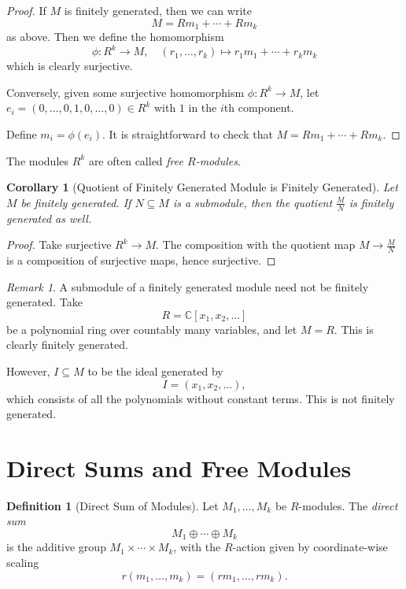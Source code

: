 \documentclass{article}
\newtheorem{corollary}[theorem]{Corollary}
\theoremstyle{definition}
\newtheorem{definition}[theorem]{Definition}
\theoremstyle{remark}
\newtheorem{remark}[theorem]{Remark}
\newcommand{\pqty}[1]{\left(#1\right)}
\newcommand{\bqty}[1]{\left[#1\right]}
\newcommand{\flatfrac}[2]{\frac{#1}{#2}}
\newcommand{\functiondomain}[3]{#1:#2\to #3}
\newcommand{\function}[5]{#1:#2\to #3,\quad #4\mapsto #5}
\newcommand{\submodule}{\subseteq}
\newcommand{\CC}{\mathbb{C}}
\begin{document}
\begin{proof}
    If \(M\) is finitely generated, then we can write
    \[
        M = R m_1 + \cdots + R m_k
    \]
    as above. Then we define the homomorphism
    \[
        \function{\phi}{R^k}{M}{\pqty{r_1, \ldots, r_k}}{r_1 m_1 + \cdots + r_k m_k}
    \]
    which is clearly surjective.

    Conversely, given some surjective homomorphism \(\functiondomain{\phi}{R^k}{M}\), let \(e_i = \pqty{0, \ldots, 0, 1, 0, \ldots, 0} \in R^k\) with \(1\) in the \(i\)th component.

    Define \(m_i = \phi\pqty{e_i}\). It is straightforward to check that \(M = R m_1 + \cdots + R m_k\).
\end{proof}

The modules \(R^k\) are often called \emph{free \(R\)-modules}.

\begin{corollary}[Quotient of Finitely Generated Module is Finitely Generated]
    \label{cor:quotient-finitely-generated}%
    Let \(M\) be finitely generated. If \(N \submodule M\) is a submodule, then the quotient \(\flatfrac{M}{N}\) is finitely generated as well.
\end{corollary}

\begin{proof}
    Take surjective \(R^k \to M\). The composition with the quotient map \(M \to \flatfrac{M}{N}\) is a composition of surjective maps, hence surjective.
\end{proof}

\begin{remark}
    A submodule of a finitely generated module need not be finitely generated. Take
    \[
        R = \CC\bqty{x_1, x_2, \ldots}
    \]
    be a polynomial ring over countably many variables, and let \(M = R\). This is clearly finitely generated.

    However, \(I \submodule M\) to be the ideal generated by
    \[
        I = \pqty{x_1, x_2, \ldots},
    \]
    which consists of all the polynomials without constant terms. This is not finitely generated.
\end{remark}



\section{Direct Sums and Free Modules}

\begin{definition}[Direct Sum of Modules]
    \label{def:direct-sum-modules}%
    Let \(M_1, \ldots, M_k\) be \(R\)-modules. The \emph{direct sum}
    \[
        M_1 \oplus \cdots \oplus M_k
    \]
    is the additive group \(M_1 \times \cdots \times M_k\), with the \(R\)-action given by coordinate-wise scaling
    \[
        r\pqty{m_1, \ldots, m_k} = \pqty{r m_1, \ldots, r m_k}.
    \]
\end{definition}
\end{document}
